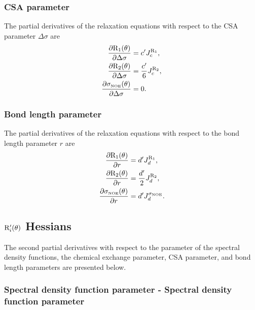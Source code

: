 \subsubsection{CSA parameter}

The partial derivatives of the relaxation equations with respect to the CSA parameter $\Delta\sigma$ are
\begin{align}
    \frac{\partial \mathrm{R}_1(\theta)}{\partial \Delta\sigma} &= c' J_c^{\mathrm{R}_1},             \label{eq: Ri': dR1/dCSA} \\
    \frac{\partial \mathrm{R}_2(\theta)}{\partial \Delta\sigma} &= \frac{c'}{6} J_c^{\mathrm{R}_2},   \label{eq: Ri': dR2/dCSA} \\
    \frac{\partial \sigma_{\scriptscriptstyle \mathrm{NOE}}(\theta)}{\partial \Delta\sigma} &= 0.                 \label{eq: Ri': dsigmaNOE/dCSA}
\end{align}


\subsubsection{Bond length parameter}

The partial derivatives of the relaxation equations with respect to the bond length parameter $r$ are
\begin{align}
    \frac{\partial \mathrm{R}_1(\theta)}{\partial r} &= d' J_d^{\mathrm{R}_1},                \label{eq: Ri': dR1/dr} \\
    \frac{\partial \mathrm{R}_2(\theta)}{\partial r} &= \frac{d'}{2} J_d^{\mathrm{R}_2},      \label{eq: Ri': dR2/dr} \\
    \frac{\partial \sigma_{\scriptscriptstyle \mathrm{NOE}}(\theta)}{\partial r} &= d' J_d^{\sigma_{\scriptscriptstyle \mathrm{NOE}}}.  \label{eq: Ri': dsigmaNOE/dr}
\end{align}



\subsection{$\mathrm{R}_i'(\theta)$ Hessians}

The second partial derivatives with respect to the parameter of the spectral density functions, the chemical exchange parameter, CSA parameter, and bond length parameters are presented below.


\subsubsection{Spectral density function parameter - Spectral density function parameter}

